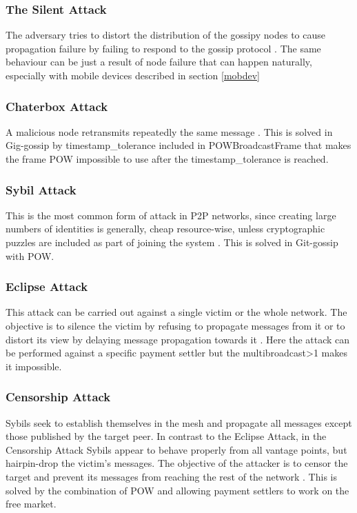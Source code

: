 \documentclass{article}
\begin{document}
\subsubsection{The Silent Attack}
The adversary tries to distort the distribution of the gossipy nodes to cause propagation failure by failing to respond to the gossip protocol \cite{AdHocNet}. The same behaviour can be just a result of node failure that can happen naturally, especially with mobile devices described in section \ref{mobdev} 

\subsubsection{Chaterbox Attack}
A malicious node retransmits repeatedly the same message \cite{AdHocNet}. This is solved in Gig-gossip by timestamp\_tolerance included in POWBroadcastFrame that makes the frame POW impossible to use after the timestamp\_tolerance is reached.

\subsubsection{Sybil Attack}
This is the most common form of attack in P2P networks, since creating large numbers of identities is generally, cheap resource-wise, unless cryptographic puzzles are included as part of joining the system \cite{GossipSub}. This is solved in Git-gossip with POW.

\subsubsection{Eclipse Attack}
This attack can be carried out against a single victim or the whole network. The objective is to
silence the victim by refusing to propagate messages from it or to distort its view by delaying message propagation towards it \cite{GossipSub}.
Here the attack can be performed against a specific payment settler but the multibroadcast>1 makes it impossible.

\subsubsection{Censorship Attack}
Sybils seek to establish themselves in the mesh and propagate all messages except those published by the target peer. In contrast to the Eclipse Attack, in the Censorship Attack Sybils appear to behave properly from all vantage points, but hairpin-drop the victim's messages. The objective of the attacker is to censor the target and prevent its messages from reaching the rest of the network \cite{GossipSub}. This is solved by the combination of POW and allowing payment settlers to work on the free market.
\end{document}
